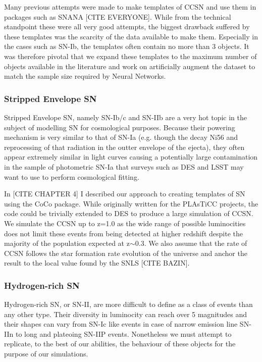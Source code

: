 Many previous attempts were made to make templates of CCSN and use them in packages such as SNANA [CITE EVERYONE]. While from the technical standpoint these were all very good attempts, the biggest drawback suffered by these templates was the scarcity of the data available to make them. Especially in the cases such as SN-Ib, the templates often contain no more than 3 objects. It was therefore pivotal that we expand these templates to the maximum number of objects available in the literature and work on artificially augment the dataset to match the sample size required by Neural Networks.

\subsubsection{Stripped Envelope SN}
Stripped Envelope SN, namely SN-Ib/c and SN-IIb are a very hot topic in the subject of modelling SN for cosmological purposes. Because their powering mechanism is very similar to that of SN-Ia (e.g. though the decay Ni56 and reprocessing of that radiation in the outter envelope of the ejecta), they often appear extremely similar in light curves causing a potentially large contamination in the sample of photometric SN-Ia that surveys such as DES and LSST may want to use to perform cosmological fitting.

In [CITE CHAPTER 4] I described our approach to creating templates of SN using the CoCo package. While originally written for the PLAsTiCC projects, the code could be trivially extended to DES to produce a large simulation of CCSN. We simulate the CCSN up to z=1.0 as the wide range of possible luminocities does not limit these events from being detected at higher redshift despite the majority of the population expected at z$\sim$0.3. We also assume that the rate of CCSN follows the star formation rate evolution of the universe and anchor the result to the local value found by the SNLS [CITE BAZIN]. \\

\subsubsection{Hydrogen-rich SN}
Hydrogen-rich SN, or SN-II, are more difficult to define as a class of events than any other type. Their diversity in luminocity can reach over 5 magnitudes and their shapes can vary from SN-Ic like events in case of narrow emission line SN-IIn to long and plateoing SN-IIP events. Nonetheless we must attempt to replicate, to the best of our abilities, the behaviour of these objects for the purpose of our simulations.

